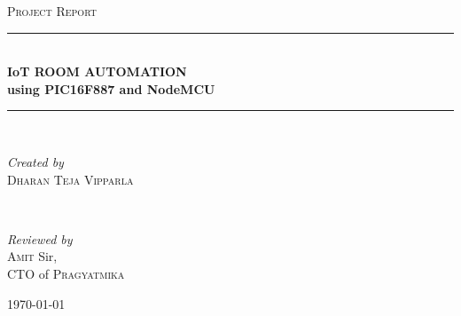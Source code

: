\documentclass[11pt,a4paper]{article}
\begin{document}

\begin{titlepage} %

\newcommand{\HRule}{\rule{\linewidth}{0.5mm}} %


\begin{center}
\vspace*{3.3cm}
\textsc{\LARGE{Project Report}}\\
\vspace*{1cm}

\HRule\\[0.4cm]	
\Huge{\bfseries{IoT ROOM AUTOMATION}}\\
\Huge{\bfseries{using PIC16F887 and NodeMCU}}\\[0.4cm]
\HRule\\[1.5cm]

\begin{minipage}{0.4\textwidth}
		\begin{flushleft}
			\large
			\textit{Created by}\\
			\textsc{Dharan Teja Vipparla}\\ %
		\end{flushleft}
	\end{minipage}
	~
	\begin{minipage}{0.4\textwidth}
		\begin{flushright}
			\large
			\textit{Reviewed by}\\
			\textsc{Amit} Sir,\\ %
			CTO of \textsc{Pragyatmika}\\
		\end{flushright}
	\end{minipage}

\vfill\vfill\vfill %

{\large{\today}}
\vfill	%

\end{center}

\end{titlepage}
\end{document}
